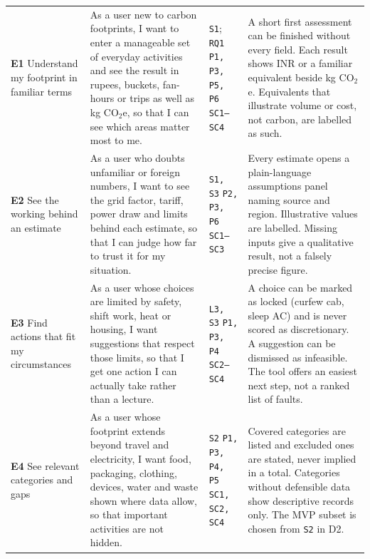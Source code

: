 \documentclass[12pt, a4paper]{article}
\newcommand{\co}{CO$_2$e}
\begin{document}
{\begin{longtable}{|>{\raggedright\arraybackslash}p{2.6cm}|>{\raggedright\arraybackslash}p{5.1cm}|>{\raggedright\arraybackslash}p{3.0cm}|>{\raggedright\arraybackslash}p{4.9cm}|}
\rowcolor{cTerracotta}\multicolumn{4}{|l|}{\textcolor{white}{\textbf{MUST HAVE: the core journey and its trustworthiness}}} \\
\hline
\textbf{E1} Understand my footprint in familiar terms &
As a user new to carbon footprints, I want to enter a manageable set of everyday activities and see the result in rupees, buckets, fan-hours or trips as well as kg \co{}, so that I can see which areas matter most to me. &
\texttt{S1}; \texttt{RQ1} \newline \texttt{P1, P3, P5, P6} \newline \texttt{SC1--SC4} &
A short first assessment can be finished without every field. Each result shows INR or a familiar equivalent beside kg \co{}. Equivalents that illustrate volume or cost, not carbon, are labelled as such. \\
\hline
\textbf{E2} See the working behind an estimate &
As a user who doubts unfamiliar or foreign numbers, I want to see the grid factor, tariff, power draw and limits behind each estimate, so that I can judge how far to trust it for my situation. &
\texttt{S1, S3} \newline \texttt{P2, P3, P6} \newline \texttt{SC1--SC3} &
Every estimate opens a plain-language assumptions panel naming source and region. Illustrative values are labelled. Missing inputs give a qualitative result, not a falsely precise figure. \\
\hline
\textbf{E3} Find actions that fit my circumstances &
As a user whose choices are limited by safety, shift work, heat or housing, I want suggestions that respect those limits, so that I get one action I can actually take rather than a lecture. &
\texttt{L3, S3} \newline \texttt{P1, P3, P4} \newline \texttt{SC2--SC4} &
A choice can be marked as locked (curfew cab, sleep AC) and is never scored as discretionary. A suggestion can be dismissed as infeasible. The tool offers an easiest next step, not a ranked list of faults. \\
\hline
\textbf{E4} See relevant categories and gaps &
As a user whose footprint extends beyond travel and electricity, I want food, packaging, clothing, devices, water and waste shown where data allow, so that important activities are not hidden. &
\texttt{S2} \newline \texttt{P1, P3, P4, P5} \newline \texttt{SC1, SC2, SC4} &
Covered categories are listed and excluded ones are stated, never implied in a total. Categories without defensible data show descriptive records only. The MVP subset is chosen from \texttt{S2} in D2. \\

\end{longtable}}
\end{document}
